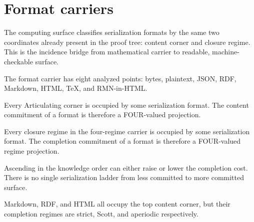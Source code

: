 \section{Format carriers}

The computing surface classifies serialization formats by the same two
coordinates already present in the proof tree: content corner and closure
regime.  This is the incidence bridge from mathematical carrier to readable,
machine-checkable surface.

\begin{proposition}\label{thm:format-carrier-eight}\leanok{}
The format carrier has eight analyzed points: bytes, plaintext, JSON, RDF,
Markdown, HTML, TeX, and RMN-in-HTML.
\end{proposition}

\begin{theorem}\label{thm:format-corner-onto}\leanok{}
Every Articulating corner is occupied by some serialization format.  The
content commitment of a format is therefore a FOUR-valued projection.
\end{theorem}

\begin{theorem}\label{thm:format-regime-onto}\leanok{}
Every closure regime in the four-regime carrier is occupied by some
serialization format.  The completion commitment of a format is therefore a
FOUR-valued regime projection.
\end{theorem}

\begin{theorem}\label{thm:format-cost-nonmonotone}\leanok{}
Ascending in the knowledge order can either raise or lower the completion
cost.  There is no single serialization ladder from less committed to more
committed surface.
\end{theorem}

\begin{theorem}\label{thm:format-top-corner-multi-regime}\leanok{}
Markdown, RDF, and HTML all occupy the top content corner, but their
completion regimes are strict, Scott, and aperiodic respectively.
\end{theorem}

